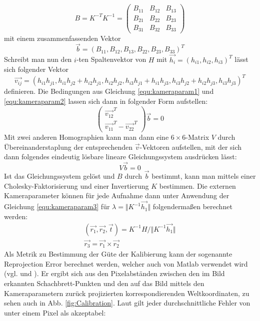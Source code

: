 \begin{equation}
	B = K^{-T}K^{-1} = \begin{pmatrix}
			B_{11} & B_{12} & B_{13} \\
			B_{21} & B_{22} & B_{23} \\
			B_{31} & B_{32} & B_{33}
		\end{pmatrix}
\end{equation}
mit einem zusammenfassenden Vektor
\begin{equation}
	\vec{b} = \left( B_{11}, B_{12}, B_{13}, B_{22}, B_{23}, B_{33} \right)^T
\end{equation}
Schreibt man nun den \(i\)-ten Spaltenvektor von \(H\) mit \(\vec{h_i} = \left( h_{i1}, h_{i2}, h_{i3} \right)^T\) lässt sich folgender Vektor 
\begin{equation}
	\vec{v_{ij}} = \left( h_{i1}h_{j1}, h_{i1}h_{j2}+h_{i2}h_{j1}, h_{i2}h_{j2},h_{i3}h_{j1}+h_{i1}h_{j3}, h_{i3}h_{j2}+h_{i2}h_{j3},h_{i3}h_{j3}\right)^T
\end{equation}
definieren. Die Bedingungen aus Gleichung \ref{equ:kameraparam1} und \ref{equ:kameraparam2} lassen sich dann in folgender Form aufstellen:
\begin{equation}
	\left( \begin{array}{c}\vec{v_{12}}^T\\\vec{v_{11}}^T - \vec{v_{22}}^T\end{array} \right)\vec{b} = 0
\end{equation}
Mit zwei anderen Homographien kann man dann eine \(6 \times 6\)-Matrix \(V\) durch Übereinanderstaplung der entsprechenden \(\vec{v}\)-Vektoren aufstellen, mit der sich dann folgendes eindeutig lösbare lineare Gleichungssystem ausdrücken lässt:
\begin{equation}
	V\vec{b} = 0
\end{equation}
Ist das Gleichungssystem gelöst und \(B\) durch \(\vec{b}\) bestimmt, kann man mittels einer Cholesky-Faktorisierung und einer Invertierung \(K\) bestimmen. Die externen Kameraparameter können für jede Aufnahme dann unter Anwendung der Gleichung \ref{equ:kameraparam3} für \(\lambda = \Vert K^{-1}\vec{h_1} \Vert\) folgendermaßen berechnet werden:
\begin{gather}
	\left(\vec{r_1},\vec{r_2},\vec{t}\right) = K^{-1}H \slash \Vert K^{-1}\vec{h_1} \Vert \\
	\vec{r_3} = \vec{r_1} \times \vec{r_2}
\end{gather}
Als Metrik zu Bestimmung der Güte der Kalibierung kann der sogenannte Reprojection Error berechnet werden, welcher auch von Matlab verwendet wird (vgl. \cite{Mathworks:17a} und \cite{StackOverflow:15}). Er ergibt sich aus den Pixelabständen zwischen den im Bild erkannten Schachbrett-Punkten und den auf das Bild mittels den Kameraparametern zurück projizierten korrespondierenden Weltkoordinaten, zu sehen auch in Abb. \ref{fig:Calibration}. Laut \cite{Mathworks:17a} gilt jeder durchschnittliche Fehler von unter einem Pixel als akzeptabel:
